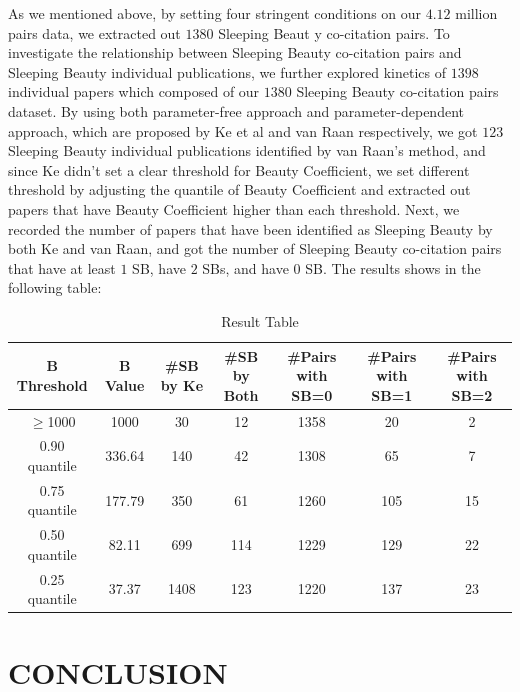 \documentclass[utf8]{frontiersSCNS}
\begin{document}
{As we mentioned above, by setting four stringent conditions on our $4.12$ million pairs data, we extracted out $1380$ Sleeping Beaut y co-citation pairs. To investigate the relationship between Sleeping Beauty co-citation pairs and Sleeping Beauty individual publications, we further explored kinetics of $1398$ individual papers which composed of our $1380$ Sleeping Beauty co-citation pairs dataset. By using both parameter-free approach and parameter-dependent approach, which are proposed by Ke et al and van Raan respectively, we got $123$ Sleeping Beauty individual publications identified by van Raan's method, and since Ke didn't set a clear threshold for Beauty Coefficient, we set different threshold by adjusting the quantile of Beauty Coefficient and extracted out papers that have Beauty Coefficient higher than each threshold. Next, we recorded the number of papers that have been identified as Sleeping Beauty by both Ke and van Raan, and got the number of Sleeping Beauty co-citation pairs that have at least $1$ SB, have $2$ SBs, and have $0$ SB. The results shows in the following table:
\begin{table}[ht]
\caption{Result Table} %
\centering %
\begin{center}
\begin{tabular}{c c c c c c c} %
B Threshold & B Value & \#SB by Ke & \#SB by Both & \#Pairs with SB=0 & \#Pairs with SB=1 & \#Pairs with SB=2 \\ [0.5ex] %
\hline %
$\geq$1000 & 1000 & 30 & 12 & 1358 & 20 & 2 \\ %
0.90 quantile & 336.64 &140 & 42 & 1308 & 65 & 7 \\
0.75 quantile & 177.79 & 350 & 61 & 1260 & 105 & 15 \\
0.50 quantile & 82.11 & 699 & 114 & 1229 & 129 & 22 \\
0.25 quantile & 37.37 & 1408 & 123 & 1220 & 137 & 23 \\ [1ex] %
\hline %
\end{tabular}
\end{center}
\label{table:nonlin} %
\end{table}


\section{CONCLUSION}

}
\end{document}
